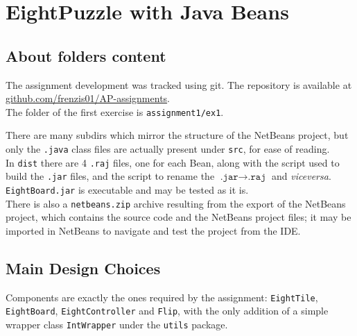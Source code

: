 \chapter{EightPuzzle with Java Beans}

\section{About folders content}

The assignment development was tracked using git. The repository is available at \href{https://github.com/frenzis01/AP-assignments}{github.com/frenzis01/AP-assignments}.\\
The folder of the first exercise is \texttt{assignment1/ex1}.
 
There are many subdirs which mirror the structure of the NetBeans project, but only the \texttt{.java} class files are actually present under \texttt{src}, for ease of reading.\\
In \texttt{dist} there are 4 \texttt{.raj} files, one for each Bean, along with the script used to build the \texttt{.jar} files, and the script to rename the $\texttt{.jar}\rightarrow\texttt{.raj}$ and \textit{viceversa}.
\texttt{EightBoard.jar} is executable and may be tested as it is.\\
There is also a \texttt{netbeans.zip} archive resulting from the export of the NetBeans project, which contains the source code and the NetBeans project files; it may be imported in NetBeans to navigate and test the project from the IDE.


\section{Main Design Choices}

Components are exactly the ones required by the assignment: \lstinline|EightTile|, \lstinline|EightBoard|, \lstinline|EightController| and \lstinline|Flip|, with the only addition of a simple wrapper class \lstinline|IntWrapper| under the \lstinline|utils| package.

